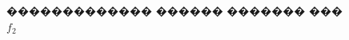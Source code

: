 \documentclass[a4paper]{article}
\begin{document}
\begin{figure}[h]
\begin{minipage}[h]{0.49\linewidth}
  \end{minipage}
  \caption{������������� ������ ������� ��� $f_2$}
  \label{ris:image1}
\end{figure}
\end{document}
